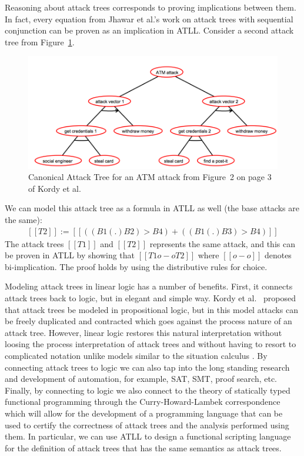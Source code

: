Reasoning about attack trees corresponds to proving implications
between them.  In fact, every equation from Jhawar et al.'s
work on attack trees with sequential conjunction \cite{Jhawar:2015}
can be proven as an implication in ATLL.  Consider a second attack
tree from Figure~\ref{fig:atm-tree2}.
\begin{figure}
  \begin{center}
    \includegraphics[scale=0.35]{ATM-Tree2}
  \end{center}
  \caption{Canonical Attack Tree for an ATM attack from Figure~2 on page 3 of Kordy et al.~\cite{Kordy2017}}
  \label{fig:atm-tree2}
\end{figure}
We can model this attack tree as a formula in ATLL as well (the base
attacks are the same):
\[
\begin{array}{lll}
  [[T2]] := [[((B1 (.) B2) > B4) + ((B1 (.) B3) > B4)]]
\end{array}
\]
The attack trees $[[T1]]$ and $[[T2]]$ represents the same attack, and
this can be proven in ATLL by showing that $[[T1 o-o T2]]$ where
$[[o-o]]$ denotes bi-implication.  The proof holds by using the
distributive rules for choice.

Modeling attack trees in linear logic has a number of benefits.
First, it connects attack trees back to logic, but in elegant and
simple way.  Kordy et al.~\cite{Kordy2010,Kordy:2012} proposed that
attack trees be modeled in propositional logic, but in this model
attacks can be freely duplicated and contracted which goes against the
process nature of an attack tree.  However, linear logic restores this
natural interpretation without loosing the process interpretation of
attack trees and without having to resort to complicated notation
unlike models similar to the situation calculus \cite{Samarji2013}.
By connecting attack trees to logic we can also tap into the long
standing research and development of automation, for example, SAT,
SMT, proof search, etc.  Finally, by connecting to logic we also
connect to the theory of statically typed functional programming
through the Curry-Howard-Lambek correspondence which will allow for
the development of a programming language that can be used to certify
the correctness of attack trees and the analysis performed using them.
In particular, we can use ATLL to design a functional scripting
language for the definition of attack trees that has the same
semantics as attack trees.

